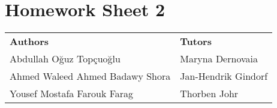 \documentclass{article}
\begin{document}
\section*{\huge Homework Sheet 2}
\begin{flushright}
  \begin{tabular}{@{} l l @{}}
    \textbf{Authors} & \textbf{Tutors} \\
    Abdullah Oğuz Topçuoğlu & Maryna Dernovaia \\
    Ahmed Waleed Ahmed Badawy Shora & Jan-Hendrik Gindorf \\
    Yousef Mostafa Farouk Farag& 
    Thorben Johr \\
  \end{tabular}
\end{flushright}

\end{document}
